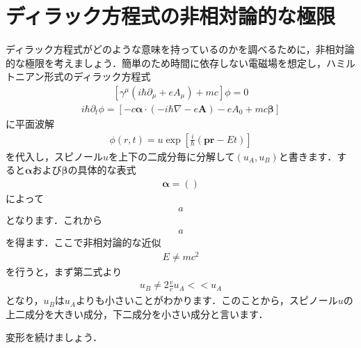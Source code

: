 \documentclass[a4j]{jarticle}
\title{}
\begin{document}
\section{ディラック方程式の非相対論的な極限}
ディラック方程式がどのような意味を持っているのかを調べるために，非相対論的な極限を考えましょう．簡単のため時間に依存しない電磁場を想定し，ハミルトニアン形式のディラック方程式
\begin{align*}
\left[\gamma^{\mu}\left(i\hbar\partial_{\mu}+eA_{\mu}\right)+mc\right]\phi=0
\end{align*}
\begin{align*}
 i\hbar\partial_t\phi=\left[-c\bm{\alpha}\cdot\left(-i\hbar\nabla-e\bm{A}\right)-eA_0+mc\bm{\beta}\right]
\end{align*}
に平面波解
\begin{align*}
 \phi(r,t)=u\exp\left[\frac{i}{\hbar}\left(\bm{p}\bm{r}-Et\right)\right]
\end{align*}
を代入し，スピノール$u$を上下の二成分毎に分解して$(u_A,u_B)$と書きます．すると$\bm{\alpha}$および$\bm{\beta}$の具体的な表式
\begin{align*}
 \bm{\alpha}=\left(
 

 \right)
\end{align*}
によって
\begin{align*}
 a
\end{align*}
となります．これから
\begin{align*}
 a
\end{align*}
を得ます．ここで非相対論的な近似
\begin{align*}
 E\neq mc^2
\end{align*}
を行うと，まず第二式より
\begin{align*}
 u_B\neq 2\frac{v}{c}u_A<<u_A
\end{align*}
となり，$u_B$は$u_A$よりも小さいことがわかります．このことから，スピノール$u$の上二成分を大きい成分，下二成分を小さい成分と言います．

変形を続けましょう．
\end{document}
